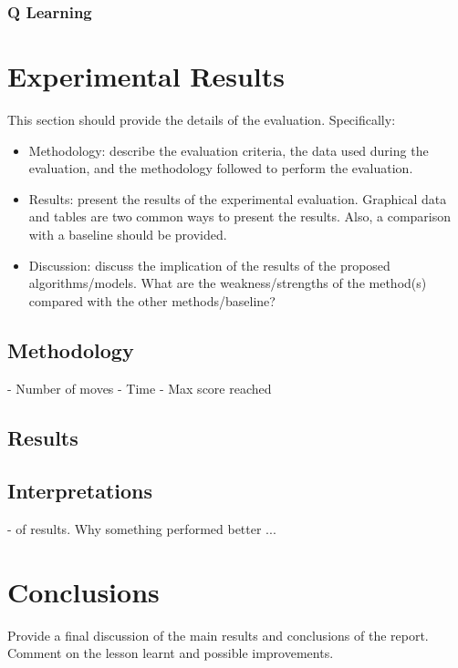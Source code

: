 \documentclass{svproc}
\begin{document}
    	\subsubsection{Q Learning}

    \section{Experimental Results}
    This section should provide the details of the evaluation. Specifically:
    \begin{itemize}
        \item Methodology: describe the evaluation criteria, the data used during the evaluation, and the methodology followed to perform the evaluation.
        \item Results: present the results of the experimental evaluation. Graphical data and tables are two common ways to present the results. Also, a comparison with a baseline should be provided.
        \item Discussion: discuss the implication of the results of the proposed algorithms/models. What are the weakness/strengths of the method(s) compared with the other methods/baseline?
    \end{itemize}
    	
		\subsection{Methodology}
		 - Number of moves
		 - Time
		 - Max score reached
		 
		\subsection{Results}
		
		\subsection{Interpretations}
			- of results. Why something performed better ...
    \section{Conclusions}
    Provide a final discussion of the main results and conclusions of the report. Comment on the lesson learnt and possible improvements.



    
    
    
\end{document}
